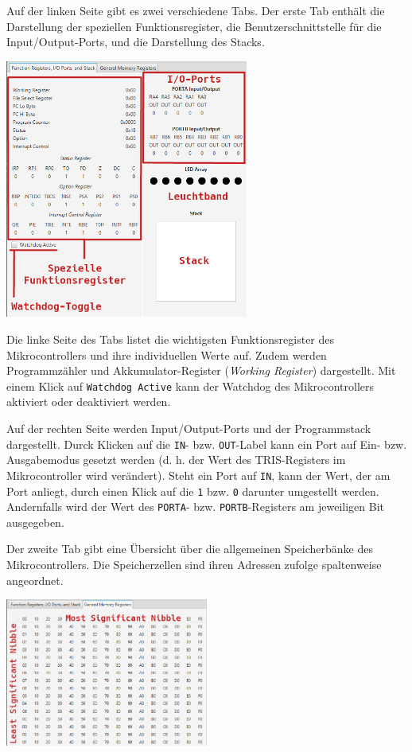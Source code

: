 \documentclass[a4paper]{article}
\begin{document}
Auf der linken Seite gibt es zwei verschiedene Tabs.
Der erste Tab enthält die Darstellung der speziellen Funktionsregister, die Benutzerschnittstelle für die Input/Output-Ports, und die Darstellung des Stacks.

\begin{center}
    \includegraphics[width=0.6\textwidth]{img/sfrview}
\end{center}

Die linke Seite des Tabs listet die wichtigsten Funktionsregister des Mikrocontrollers und ihre individuellen Werte auf.
Zudem werden Programmzähler und Akkumulator-Register (\textit{Working Register}) dargestellt.
Mit einem Klick auf \texttt{Watchdog Active} kann der Watchdog des Mikrocontrollers aktiviert oder deaktiviert werden.

Auf der rechten Seite werden Input/Output-Ports und der Programmstack dargestellt.
Durck Klicken auf die \texttt{IN}- bzw. \texttt{OUT}-Label kann ein Port auf Ein- bzw. Ausgabemodus gesetzt werden (d. h. der Wert des TRIS-Registers im Mikrocontroller wird verändert).
Steht ein Port auf \texttt{IN}, kann der Wert, der am Port anliegt, durch einen Klick auf die \texttt{1} bzw. \texttt{0} darunter umgestellt werden.
Andernfalls wird der Wert des \texttt{PORTA}- bzw. \texttt{PORTB}-Registers am jeweiligen Bit ausgegeben.

Der zweite Tab gibt eine Übersicht über die allgemeinen Speicherbänke des Mikrocontrollers.
Die Speicherzellen sind ihren Adressen zufolge spaltenweise angeordnet.

\begin{center}
    \includegraphics[width=0.5\textwidth]{img/gmrview}
\end{center}
\end{document}
